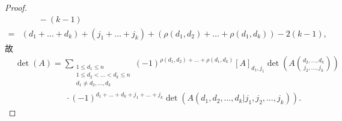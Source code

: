 \documentclass[%
    UTF8,%
    fontset=none,%
    punct=kaiming,%
    zihao=-4,%
    a4paper,%
    oneside,%
]{ctexbook}
\renewcommand*{\leq}{\leqslant}
\begin{document}
\begin{proof}
\begin{align*}
             & \quad \quad
        - (k - 1)
        \\
        = {} &
        (d_1 + \dots + d_k) + (j_1 + \dots + j_k)
        + (\rho(d_1, d_2) + \dots + \rho(d_1, d_k))
        - 2(k-1),
    \end{align*}
    故
    \begin{align*}
         &
        \det {(A)}
        = \sum_{\substack{
        1 \leq d_1 \leq n               \\
        1 \leq d_2 < \dots < d_k \leq n \\
                d_1 \neq d_2,\dots,d_k
            }}
        {(-1)^{\rho(d_1, d_2) + \dots + \rho(d_1, d_k)}
                [A]_{d_1,j_1}
            \det {\left(
                A\binom{d_2, \dots, d_k}{j_2, \dots, j_k}
                \right)}}
        \\
         &
        \qquad \qquad \qquad
        \cdot (-1)^{d_1 + \dots + d_k + j_1 + \dots + j_k}
        \det {(A({d_1,d_2,\dots,d_k}|{j_1,j_2,\dots,j_k}))}.
    \end{align*}

    \begingroup

    \makeatletter
    \providecommand*{\subalign}[1]{%
        \vcenter{%
            \Let@ \restore@math@cr \default@tag
            \baselineskip\fontdimen10 \scriptfont\tw@
            \advance\baselineskip\fontdimen12 \scriptfont\tw@
            \lineskip\thr@@\fontdimen8 \scriptfont\thr@@
            \lineskiplimit\lineskip
            \ialign{\hfil\(\m@th\scriptstyle##\)&%
                \(\m@th\scriptstyle{}##\)\hfil\crcr
                #1\crcr
            }%
        }%
    }
    \makeatother


\end{proof}
\end{document}
